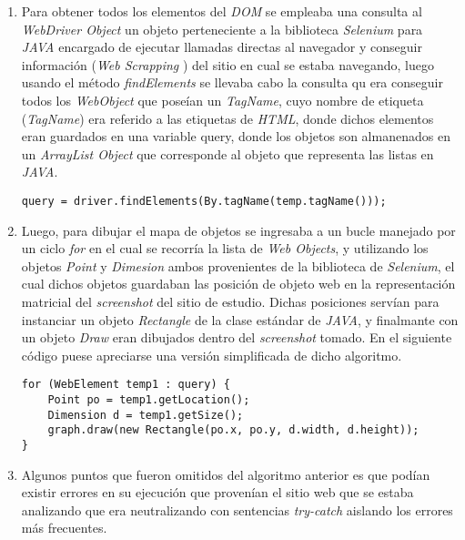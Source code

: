         \begin{enumerate}
         \item Para obtener todos los elementos del \textit{DOM} se empleaba una consulta al 
         \textit{WebDriver Object} un objeto perteneciente a la biblioteca \textit{Selenium} 	
         para
         \textit{JAVA} encargado de ejecutar llamadas directas al navegador y conseguir información
         (\textit{Web Scrapping} \cite{ref8}) del sitio en cual se estaba navegando, luego usando el 
         método \textit{findElements} se llevaba cabo la consulta qu era conseguir todos los 
         \textit{WebObject} que poseían un \textit{TagName}, cuyo nombre de etiqueta 
         (\textit{TagName}) era referido a las etiquetas de \textit{HTML}, donde dichos elementos
         eran guardados en una variable query, donde los objetos son almanenados en un 
         \textit{ArrayList Object} que corresponde al objeto que representa las listas en 
         \textit{JAVA}.
			\begin{lstlisting}[style=Java, caption={Obtención \textit{WebObjects}.}]
           	query = driver.findElements(By.tagName(temp.tagName()));
\end{lstlisting}
		\item Luego, para dibujar el mapa de objetos se ingresaba a un bucle manejado por un ciclo
		\textit{for} en el cual se recorría la lista de \textit{Web Objects}, y utilizando los 
		objetos \textit{Point} y \textit{Dimesion} ambos provenientes de la biblioteca de 
		\textit{Selenium}, el cual dichos objetos guardaban las posición de objeto web 
		en la representación matricial del \textit{screenshot} del sitio de estudio. Dichas
		posiciones servían para instanciar un objeto \textit{Rectangle} de la clase estándar
		de \textit{JAVA}, y finalmante con un objeto \textit{Draw} eran dibujados dentro del 
		\textit{screenshot} tomado. En el siguiente código puese apreciarse una versión simplificada
		de dicho algoritmo.
					\begin{lstlisting}[style=Java, caption={Algoritmo mapa de objetos simplificado.}]
for (WebElement temp1 : query) {
	Point po = temp1.getLocation();
    Dimension d = temp1.getSize();
    graph.draw(new Rectangle(po.x, po.y, d.width, d.height));
}
\end{lstlisting}
		\item Algunos puntos que fueron omitidos del algoritmo anterior es que podían existir 
		errores en su ejecución que provenían el sitio web que se estaba analizando que era 
		neutralizando con sentencias \textit{try-catch} aislando los errores más frecuentes.

\end{enumerate}
